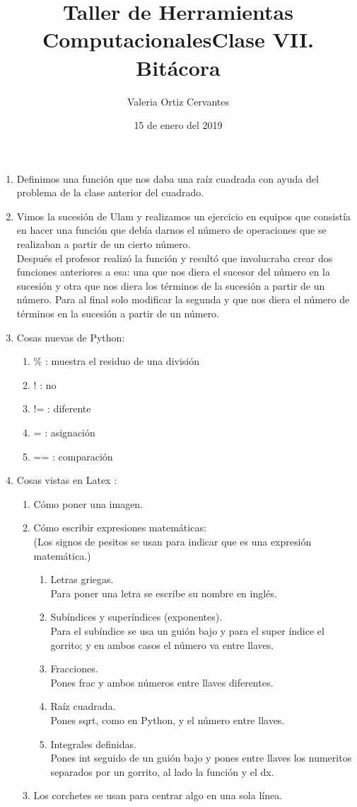 \documentclass{article}
\title{\Huge Taller de Herramientas Computacionales}
\author{Valeria Ortiz Cervantes}
\date{15 de enero del 2019}
\begin{document}
	\maketitle
	\newpage
	\title{Clase VII. Bitácora\\}
	\begin{enumerate}
		\item Definimos una función que nos daba una raíz cuadrada con ayuda del problema de la clase anterior del cuadrado.
		\item Vimos la sucesión  de Ulam y realizamos un ejercicio en equipos que consistía en hacer una función que debía darnos el número de operaciones que se realizaban a partir de un cierto número. \\ Después el profesor realizó la función y resultó que involucraba crear dos funciones anteriores a esa: una que nos diera el sucesor del número en la sucesión y otra que nos diera los términos de la sucesión a partir de un número. Para al final solo modificar la segunda y que nos diera el número de términos en la sucesión a partir de un número.
		\item Cosas nuevas de Python:
		\begin{enumerate}
			\item \% : muestra el residuo de una división
			\item ! : no 
			\item != : diferente 
			\item = : asignación
			\item == : comparación 
		\end{enumerate}
		\item Cosas vistas en Latex :
		\begin{enumerate}
			\item Cómo poner una imagen.
			\item Cómo escribir expresiones matemáticas:\\(Los signos de pesitos se usan para indicar que es una expresión matemática.)
			\begin{enumerate}
				\item Letras griegas.\\Para poner una letra se escribe su nombre en inglés.
				\item Subíndices y superíndices (exponentes).\\Para el subíndice se usa un guión bajo y para el super índice el gorrito; y en ambos casos el número va entre llaves.
				\item Fracciones.\\Pones frac y ambos números entre llaves diferentes.
				\item Raíz cuadrada.\\Pones sqrt, como en Python, y el número entre llaves.
				\item Integrales definidas.\\Pones int seguido de un guión bajo y pones entre llaves los numeritos separados por un gorrito, al lado la función y el dx.
			\end{enumerate}
			\item Los corchetes se usan para centrar algo en una sola línea.
		\end{enumerate}
	\end{enumerate}
\end{document}
